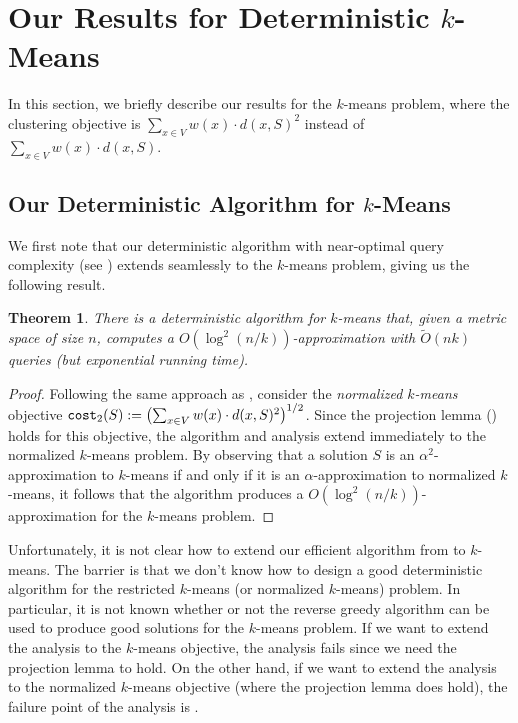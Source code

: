 \documentclass[11pt]{article}
\newcommand{\1}{\mathmybb{1}}
\newtheorem{theorem}{Theorem}[section]
\newcommand{\cost}{\textnormal{\texttt{cost}}}
\begin{document}
\section{Our Results for Deterministic $k$-Means}\label{sec:out-k-means}

In this section, we briefly describe our results for the $k$-means problem, where the clustering objective is $\sum_{x \in V}  w(x) \cdot d(x,S)^2$ instead of $\sum_{x \in V}  w(x) \cdot d(x,S)$.

\subsection{Our Deterministic Algorithm for $k$-Means}

We first note that our deterministic algorithm with near-optimal query complexity (see ) extends seamlessly to the $k$-means problem, giving us the following result.

\begin{theorem}\label{thm:kmeans:query}
    There is a deterministic algorithm for $k$-means that, given a metric space of size $n$, computes a $O(\log^2(n/k))$-approximation with $\tilde O(nk)$ queries (but exponential running time).
\end{theorem}

\begin{proof}
    Following the same approach as , consider the \emph{normalized $k$-means} objective $\cost_2(S) := \left(\sum_{x \in V}  w(x) \cdot d(x,S)^2\right)^{1/2}$. Since the projection lemma () holds for this objective, the algorithm and analysis extend immediately to the normalized $k$-means problem.
    By observing that a solution $S$ is an $\alpha^2$-approximation to $k$-means if and only if it is an $\alpha$-approximation to normalized $k$-means, it follows that the algorithm produces a $O(\log^2(n/k))$-approximation for the $k$-means problem.
\end{proof}

Unfortunately, it is not clear how to extend our efficient algorithm from  to $k$-means. The barrier is that we don't know how to design a good deterministic algorithm for the restricted $k$-means (or normalized $k$-means) problem. In particular, it is not known whether or not the reverse greedy algorithm can be used to produce good solutions for the $k$-means problem. 
If we want to extend the analysis to the $k$-means objective, the analysis fails since we need the projection lemma to hold. On the other hand, if we want to extend the analysis to the normalized $k$-means objective (where the projection lemma does hold), the failure point of the analysis is .
\end{document}

